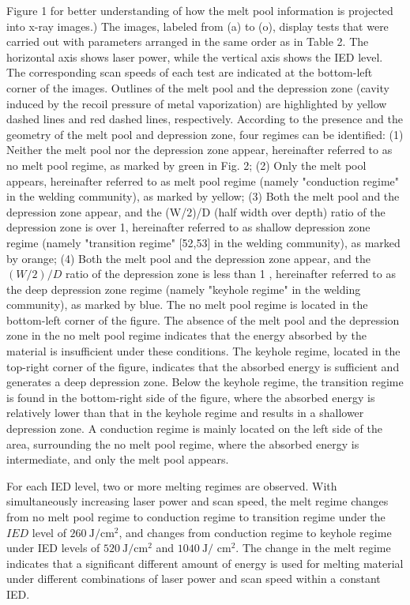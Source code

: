 \documentclass[10pt]{article}
\begin{document}
Figure 1 for better understanding of how the melt pool information is projected into x-ray images.) The images, labeled from (a) to (o), display tests that were carried out with parameters arranged in the same order as in Table 2. The horizontal axis shows laser power, while the vertical axis shows the IED level. The corresponding scan speeds of each test are indicated at the bottom-left corner of the images. Outlines of the melt pool and the depression zone (cavity induced by the recoil pressure of metal vaporization) are highlighted by yellow dashed lines and red dashed lines, respectively. According to the presence and the geometry of the melt pool and depression zone, four regimes can be identified: (1) Neither the melt pool nor the depression zone appear, hereinafter referred to as no melt pool regime, as marked by green in Fig. 2; (2) Only the melt pool appears, hereinafter referred to as melt pool regime (namely "conduction regime" in the welding community), as marked by yellow; (3) Both the melt pool and the depression zone appear, and the (W/2)/D (half width over depth) ratio of the depression zone is over 1, hereinafter referred to as shallow depression zone regime (namely "transition regime" [52,53] in the welding community), as marked by orange; (4) Both the melt pool and the depression zone appear, and the $(W / 2) / D$ ratio of the depression zone is less than 1 , hereinafter referred to as the deep depression zone regime (namely "keyhole regime" in the welding community), as marked by blue. The no melt pool regime is located in the bottom-left corner of the figure. The absence of the melt pool and the depression zone in the no melt pool regime indicates that the energy absorbed by the material is insufficient under these conditions. The keyhole regime, located in the top-right corner of the figure, indicates that the absorbed energy is sufficient and generates a deep depression zone. Below the keyhole regime, the transition regime is found in the bottom-right side of the figure, where the absorbed energy is relatively lower than that in the keyhole regime and results in a shallower depression zone. A conduction regime is mainly located on the left side of the area, surrounding the no melt pool regime, where the absorbed energy is intermediate, and only the melt pool appears.

For each IED level, two or more melting regimes are observed. With simultaneously increasing laser power and scan speed, the melt regime changes from no melt pool regime to conduction regime to transition regime under the $I E D$ level of $260 \mathrm{~J} / \mathrm{cm}^{2}$, and changes from conduction regime to keyhole regime under IED levels of $520 \mathrm{~J} / \mathrm{cm}^{2}$ and $1040 \mathrm{~J} /$ $\mathrm{cm}^{2}$. The change in the melt regime indicates that a significant different amount of energy is used for melting material under different combinations of laser power and scan speed within a constant IED.
\end{document}
